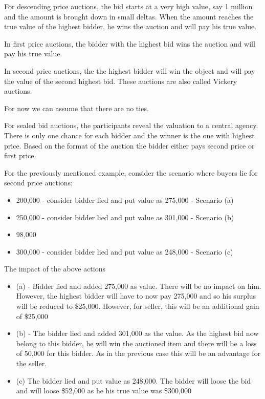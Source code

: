 \documentclass[twoside]{article}
\begin{document}
For descending price auctions, the bid starts at a very high value, say 1 million and the amount is brought down in small deltas. When the amount reaches the true value of the highest bidder, he wins the auction and will pay his true value.

In first price auctions, the bidder with the highest bid wins the auction and will pay his true value.

In second price auctions, the the highest bidder will win the object and will pay the value of the second highest bid. These auctions are also called Vickery auctions.

For now we can assume that there are no ties.

For sealed bid auctions, the participants reveal the valuation to a central agency. There is only one chance for each bidder and the winner is the one with highest price. Based on the format of the auction the bidder either pays second price or first price.

For the previously mentioned example, consider the scenario where buyers lie for second price auctions:
\begin{itemize}
  \item 200,000 -  consider bidder lied and put value as 275,000 - Scenario (a)
  \item 250,000 - consider bidder lied and put value as 301,000 - Scenario (b)
  \item 98,000
  \item 300,000 - consider bidder lied and put value as 248,000 - Scenario (c)
\end{itemize}

The impact of the above actions
\begin{itemize}
  \item (a) - Bidder lied and added 275,000 as value. There will be no impact on him. However, the highest bidder will have to now pay 275,000 and so his surplus will be reduced to \$25,000. However, for seller, this will be an additional gain of \$25,000
  \item (b) - The bidder lied and added 301,000 as the value. As the highest bid now belong to this bidder, he will win the auctioned item and there will be a loss of 50,000 for this bidder. As in the previous case this will be an advantage for the seller.
  \item (c) The bidder lied and put value as 248,000. The bidder will loose the bid and will loose \$52,000 as he his true value was \$300,000
\end{itemize}
\end{document}
